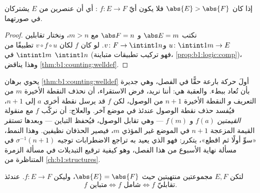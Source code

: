 \begin{corollary}\label{cor:b1:counting:pigeonhole}
إذا كان $\abs{E} > \abs{F}$ فلا يكون أيّ  $f \colon E \to F$
: أي أن عنصرين من $E$ يشتركان في صورتهما.
\end{corollary}

\begin{proof}
نكتب $\abs E = m$ و $\abs F = n$ مع $m > n$، ونختار تقابلين
$u \colon \intint1m \to E$ و$v \colon F \to \intint1n$. لو كان $f$
 لكان $v \circ f \circ u$ تطبيقًا  من
$\intint1m$ في $\intint1n$ (فهو تركيب تطبيقات متباينة،
\cref{prop:b1:logic:comp})، وهذا يناقض
\cref{thm:b1:counting:welldef}.
\end{proof}

\begin{remark}\label{rem:b1:counting:swapinterlude}
يحوي برهان \cref{thm:b1:counting:welldef} أولَ حركة بارعة حقًّا في
الفصل، وهي جديرة بأن تُعاد ببطء.
والعقبة هي: أننا نريد،  فرض الاستقراء، أن نحذف النقطة
الأخيرة $m$ من  التعريف \emph{و} النقطة الأخيرة
$n+1$ من  الوصول، لكن $f$ قد يرسل نقطة أخرى $a$ إلى $n
+ 1$، فيُفسد حذف نقطة الوصول عندئذ  في
موضع آخر. والعلاج: أن نركّب $f$ مع منقولة \emph{القيمتين}
$f(a)$ و $f(m)$ --- وهي تقابل  الوصول، فيُحفظ التباين
--- وبعدها تستقر القيمة المزعجة $n + 1$ في الموضع غير المؤذي
$m$، فيصير الحذفان نظيفين. وهذا النمط، «سوِّ أولًا ثم اقطع»،
يتكرر: فهو الذي يعيد به تراجع الاضطرابات توجيه
$\sigma^{-1}(n+1)$ في مسألة نهاية الأسبوع من هذا الفصل، وهو
كيفية ترقيع التبديلات في مسألة الزمرة المتناظرة من
\cref{ch:b1:structures}.
\end{remark}

\begin{proposition}\label{prop:b1:counting:injsur}
لتكن $E, F$ مجموعتين منتهيتين حيث $\abs{E} = \abs{F}$، وليكن $f \colon E
\to F$. عندئذ
\[
f \text{ متباين} \iff f \text{ شامل} \iff f \text{ تقابليّ}.
\]
\end{proposition}


